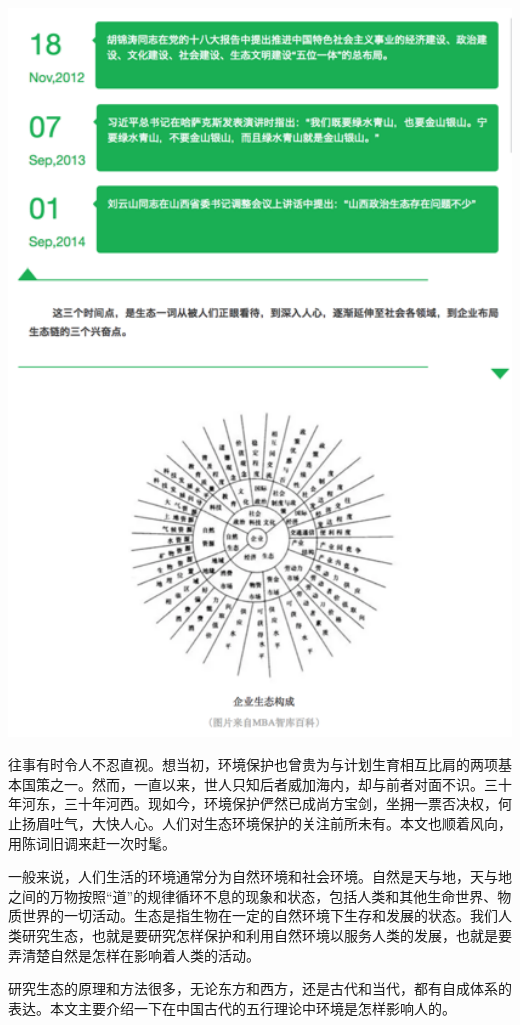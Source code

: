 \documentclass[]{book}
\begin{document}
\includegraphics[width=5.76in]{images/swr2}

往事有时令人不忍直视。想当初，环境保护也曾贵为与计划生育相互比肩的两项基本国策之一。然而，一直以来，世人只知后者威加海内，却与前者对面不识。三十年河东，三十年河西。现如今，环境保护俨然已成尚方宝剑，坐拥一票否决权，何止扬眉吐气，大快人心。人们对生态环境保护的关注前所未有。本文也顺着风向，用陈词旧调来赶一次时髦。

一般来说，人们生活的环境通常分为自然环境和社会环境。自然是天与地，天与地之间的万物按照``道''的规律循环不息的现象和状态，包括人类和其他生命世界、物质世界的一切活动。生态是指生物在一定的自然环境下生存和发展的状态。我们人类研究生态，也就是要研究怎样保护和利用自然环境以服务人类的发展，也就是要弄清楚自然是怎样在影响着人类的活动。

研究生态的原理和方法很多，无论东方和西方，还是古代和当代，都有自成体系的表达。本文主要介绍一下在中国古代的五行理论中环境是怎样影响人的。
\end{document}
